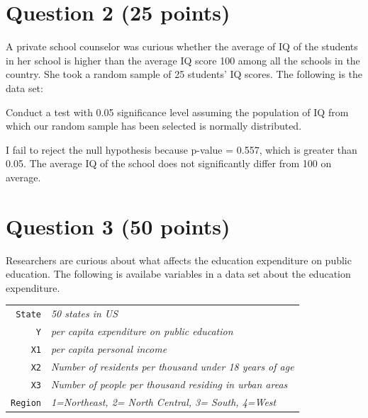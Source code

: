 \documentclass[12pt,letterpaper]{article}
\begin{document}
	\section*{Question 2 (25 points)}
	A private school counselor was curious  whether  the average of IQ of the students in her school is higher than the average IQ score 100 among all the schools in the country. She took a random sample of 25 students' IQ scores. The following is the data set:
	\vspace{.5cm}
	  
	\vspace{.5cm}
	
	\noindent Conduct a test with 0.05 significance level assuming the population of IQ from which our random sample has been selected is normally distributed. 
	
	\vspace{1cm}
	
    
    \vspace{.5cm}
    
    I fail to reject the null hypothesis because p-value = 0.557, which is greater than 0.05.
    The average IQ of the school does not significantly differ from 100 on average.
    \vspace{1cm}
	
	
	\section*{Question 3 (50 points)}
	
	\noindent Researchers are curious about what affects the education expenditure on public education. The following is availabe variables in a data set about the education expenditure. \\
	\vspace{.5cm}
	
	
	\begin{tabular}{r|l}
		\texttt{State} &\emph{50 states in US} \\
		\texttt{Y} & \emph{per capita expenditure on public education}\\
		\texttt{X1} &\emph{per capita personal income} \\
		\texttt{X2} &  \emph{Number of residents per thousand under 18 years of age}\\
		\texttt{X3} &  \emph{Number of people per thousand residing in urban areas} \\
		\texttt{Region} &  \emph{1=Northeast, 2= North Central, 3= South, 4=West} \\
	\end{tabular}
	
\end{document}
